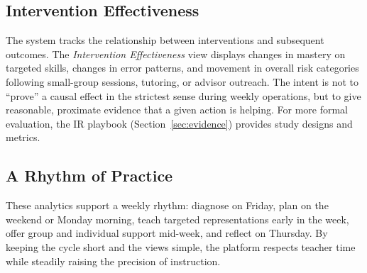 \subsection{Intervention Effectiveness}

The system tracks the relationship between interventions and subsequent outcomes. The \emph{Intervention Effectiveness} view displays changes in mastery on targeted skills, changes in error patterns, and movement in overall risk categories following small-group sessions, tutoring, or advisor outreach. The intent is not to ``prove'' a causal effect in the strictest sense during weekly operations, but to give reasonable, proximate evidence that a given action is helping. For more formal evaluation, the IR playbook (Section~\ref{sec:evidence}) provides study designs and metrics.

\subsection{A Rhythm of Practice}

These analytics support a weekly rhythm: diagnose on Friday, plan on the weekend or Monday morning, teach targeted representations early in the week, offer group and individual support mid-week, and reflect on Thursday. By keeping the cycle short and the views simple, the platform respects teacher time while steadily raising the precision of instruction.


